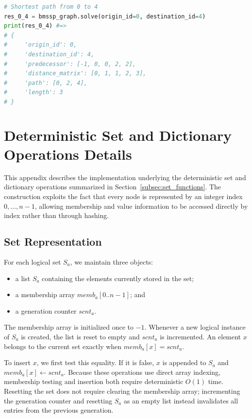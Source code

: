 \documentclass[ijoc,blindrev]{informs3} %
\begin{document}
\begin{APPENDICES}
\begin{lstlisting}[language=python]
# Shortest path from 0 to 4
res_0_4 = bmssp_graph.solve(origin_id=0, destination_id=4) 
print(res_0_4) #=>
# {
#     'origin_id': 0,
#     'destination_id': 4,
#     'predecessor': [-1, 0, 0, 2, 2],
#     'distance_matrix': [0, 1, 1, 2, 3],
#     'path': [0, 2, 4],
#     'length': 3
# }
\end{lstlisting}



\section{Deterministic Set and Dictionary Operations Details}
\label{app:set_dictionary_details}

This appendix describes the implementation underlying the deterministic set and dictionary operations summarized in Section~\ref{subsec:set_functions}. The construction exploits the fact that every node is represented by an integer index \(0,\ldots,n-1\), allowing membership and value information to be accessed directly by index rather than through hashing.

\subsection{Set Representation}

For each logical set \(S_a\), we maintain three objects:
\begin{itemize}
    \item a list \(S_a\) containing the elements currently stored in the set;
    \item a membership array \(\mathit{memb}_a[0..n-1]\); and
    \item a generation counter \(\mathit{scnt}_a\).
\end{itemize}

The membership array is initialized once to \(-1\). Whenever a new logical instance of \(S_a\) is created, the list is reset to empty and \(\mathit{scnt}_a\) is incremented. An element \(x\) belongs to the current set exactly when
\(
\mathit{memb}_a[x]=\mathit{scnt}_a.
\)

To insert \(x\), we first test this equality. If it is false, \(x\) is appended to \(S_a\) and
\(
\mathit{memb}_a[x]\leftarrow\mathit{scnt}_a.
\)
Because these operations use direct array indexing, membership testing and insertion both require deterministic \(O(1)\) time. Resetting the set does not require clearing the membership array; incrementing the generation counter and resetting \(S_a\) as an empty list instead invalidates all entries from the previous generation. 


\end{APPENDICES}
\end{document}
